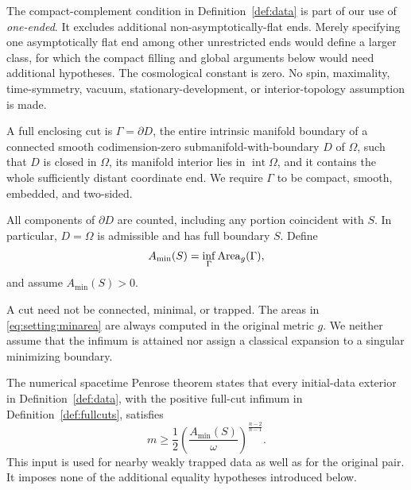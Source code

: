 The compact-complement condition in Definition~\ref{def:data} is part of
our use of \emph{one-ended}. It excludes additional non-asymptotically-flat
ends. Merely specifying one asymptotically flat end among other
unrestricted ends would define a larger class, for which the compact
filling and global arguments below would need additional hypotheses.
The cosmological constant is zero. No spin, maximality, time-symmetry,
vacuum, stationary-development, or interior-topology assumption is made.

\begin{definition}
\label{def:fullcuts}
A full enclosing cut is \(\Gamma=\partial D\), the entire intrinsic
manifold boundary of a connected smooth codimension-zero
submanifold-with-boundary \(D\) of \(\Omega\), such that \(D\) is closed
in \(\Omega\), its manifold interior lies in \(\operatorname{int}\Omega\),
and it contains the whole sufficiently distant coordinate end.
We require \(\Gamma\) to be compact, smooth, embedded, and two-sided.

All components of \(\partial D\) are counted, including any portion
coincident with \(S\). In particular, \(D=\Omega\) is admissible and
has full boundary \(S\). Define
\begin{equation}
 A_{\min}(S)=\inf_{\Gamma}\operatorname{Area}_g(\Gamma),
 \label{eq:setting:minarea}
\end{equation}
and assume \(A_{\min}(S)>0\).
\end{definition}

A cut need not be connected, minimal, or trapped. The areas in
\eqref{eq:setting:minarea} are always computed in the original metric
\(g\). We neither assume that the infimum is attained nor assign a
classical expansion to a singular minimizing boundary.

\begin{theorem}\label{thm:numerical-input}
The numerical spacetime Penrose theorem \cite[Theorem~1.3]{CompanionNumerical} states that every initial-data exterior in Definition~\ref{def:data}, with
the positive full-cut infimum in Definition~\ref{def:fullcuts}, satisfies
\begin{equation}
 \boxed{\quad
 m\ge\frac12
 \left(\frac{A_{\min}(S)}{\omega}\right)^{\frac{n-2}{n-1}} .
 \quad}
 \label{eq:setting:main}
\end{equation}
This input is used for nearby weakly trapped data as well as for the
original pair. It imposes none of the additional equality hypotheses
introduced below.
\end{theorem}

